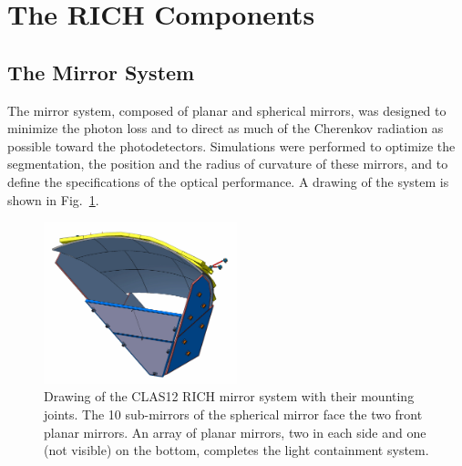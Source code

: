 \documentclass[5p,times,twocolumn]{elsarticle}
\begin{document}

\section{The RICH Components}

\subsection{The Mirror System}

The mirror system, composed of planar and spherical mirrors, was designed to minimize the photon loss and to direct
as much of the Cherenkov radiation as possible toward the photodetectors. Simulations were performed to optimize
the segmentation, the position and the radius of curvature of these mirrors, and to define the specifications of the
optical performance. A drawing of the system is shown in Fig.~\ref{Fig:RICHmirrors}.

\begin{figure}
\begin{center}
\includegraphics[width=0.50\textwidth]{RICHmirrors.pdf}
\caption{Drawing of the CLAS12 RICH mirror system with their mounting joints. The 10 sub-mirrors of the spherical mirror face the
two front planar mirrors. An array of planar mirrors, two in each side and one (not visible) on the 
bottom, completes the light containment system.}
\label{Fig:RICHmirrors}
\end{center}
\end{figure}
\end{document}
